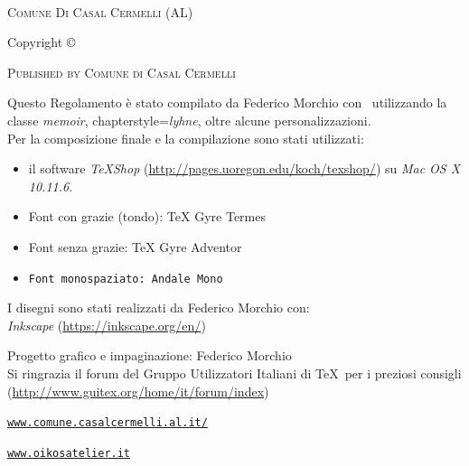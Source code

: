 
\newpage
~\vfill
\thispagestyle{empty}
\setlength{\parindent}{0pt}
\setlength{\parskip}{\baselineskip}

\par \textsc{Comune Di Casal Cermelli (AL)}

Copyright \copyright\ \the\year\ 

\par\textsc{Published by  Comune di Casal Cermelli}

\par Questo Regolamento è stato compilato da Federico Morchio con \XeLaTeX\ utilizzando la classe \emph{memoir}, chapterstyle=\emph{lyhne}, oltre alcune personalizzazioni. \\
Per la composizione finale e la compilazione sono stati utilizzati:

\begin{itemize}[topsep=-3ex,itemsep=-2ex]
\item  il software \emph{TeXShop} (\url{http://pages.uoregon.edu/koch/texshop/}) su \emph{Mac OS X 10.11.6}.\\
\item Font con grazie (tondo): TeX Gyre Termes\\
\item \textsf{Font senza grazie: TeX Gyre Adventor}\\
\item \texttt{Font monospaziato: Andale Mono}
\end{itemize}

I disegni sono stati realizzati da Federico Morchio con: \\ \emph{Inkscape} (\url{https://inkscape.org/en/})

\par Progetto grafico e impaginazione: Federico Morchio\\
Si ringrazia  il forum del Gruppo Utilizzatori Italiani di \TeX\ per i preziosi consigli (\url{http://www.guitex.org/home/it/forum/index})

\par \href{http://www.comune.casalcermelli.al.it/}{\texttt{www.comune.casalcermelli.al.it/}}

\par \href{http://www.oikosatelier.it}{\texttt{www.oikosatelier.it}}
\vfill

